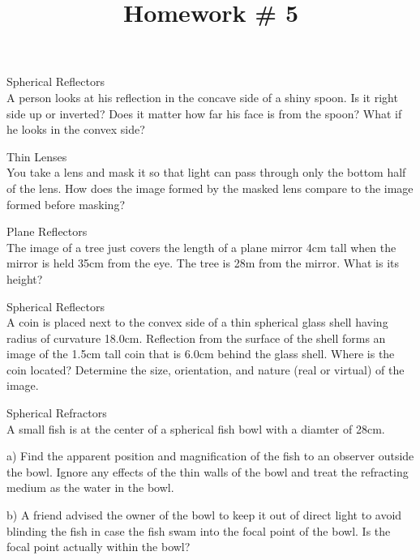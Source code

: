 \documentclass[10pt]{article}
\newenvironment{problem}[2][Problem]{\begin{trivlist}
\item[\hskip \labelsep {\bfseries #1}\hskip \labelsep {\bfseries #2.}]}{\end{trivlist}}
\begin{document}
 \title{Homework \# 5}
\date{}
\maketitle

\begin{problem}{1} Spherical Reflectors\\
A person looks at his reflection in the concave side of a shiny spoon. Is it right side up or inverted? Does it matter how far his face is from the spoon? What if he looks in the convex side?
\end{problem}

\begin{problem}{2} Thin Lenses\\
You take a lens and mask it so that light can pass through only the bottom half of the lens. How does the image formed by the masked lens compare to the image formed before masking?
\end{problem}

\begin{problem}{3} Plane Reflectors\\
The image of a tree just covers the length of a plane mirror 4cm tall when the mirror is held 35cm from the eye. The tree is 28m from the mirror. What is its height?
\end{problem}

\begin{problem}{4} Spherical Reflectors\\
A coin is placed next to the convex side of a thin spherical glass shell having radius of curvature 18.0cm. Reflection from the surface of the shell forms an image of the 1.5cm tall coin that is 6.0cm behind the glass shell. Where is the coin located? Determine the size, orientation, and nature (real or virtual) of the image.
\end{problem}

\begin{problem}{5} Spherical Refractors\\
A small fish is at the center of a spherical fish bowl with a diamter of 28cm.
\item a) Find the apparent position and magnification of the fish to an observer outside the bowl. Ignore any effects of the thin walls of the bowl and treat the refracting medium as the water in the bowl.
\item b) A friend advised the owner of the bowl to keep it out of direct light to avoid blinding the fish in case the fish swam into the focal point of the bowl. Is the focal point actually within the bowl?
\end{problem}
\end{document}
